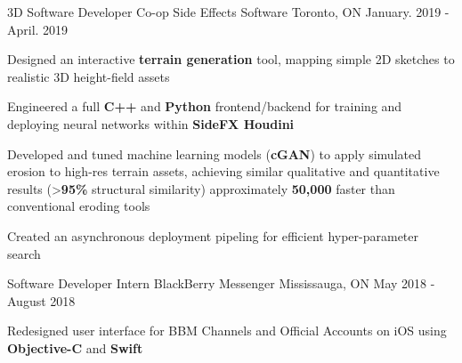 \begin{cventries}
  \cventry
    {3D Software Developer Co-op} %
    {Side Effects Software} %
    {Toronto, ON} %
    {January. 2019 - April. 2019} %
    {
      \begin{cvitems} %
        \item {Designed an interactive \textbf{terrain generation} tool, mapping simple 2D sketches to realistic 3D height-field assets}
        \item {Engineered a full \textbf{C++} and \textbf{Python} frontend/backend for training and deploying neural networks within \textbf{SideFX Houdini}}
        \item {Developed and tuned machine learning models (\textbf{cGAN}) to apply simulated erosion to high-res terrain assets, achieving similar qualitative and quantitative results (>\textbf{95\%} structural similarity) approximately \textbf{50,000\times} faster than conventional eroding tools}
        \item {Created an asynchronous deployment pipeling for efficient hyper-parameter search}
      \end{cvitems}
    }

  \cventry
    {Software Developer Intern} %
    {BlackBerry Messenger} %
    {Mississauga, ON} %
    {May 2018 - August 2018} %
    {
      \begin{cvitems} %
        \item {Redesigned user interface for BBM Channels and Official Accounts on iOS using \textbf{Objective-C} and \textbf{Swift}}
      \end{cvitems}
    }

\end{cventries}
